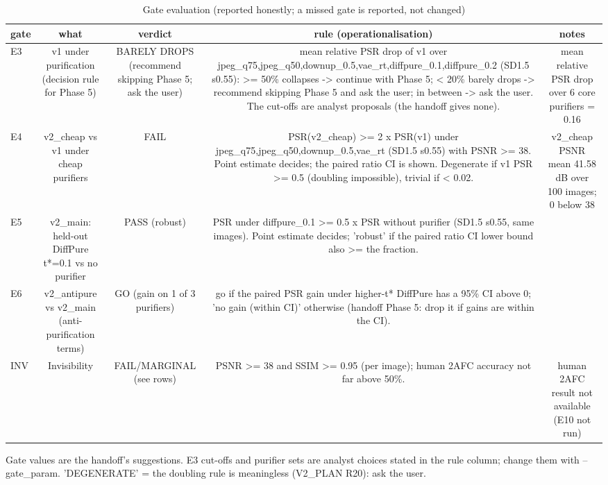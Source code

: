 \begin{table}[t]
\centering
\small
\begin{tabular}{lcccc}
\toprule
gate & what & verdict & rule (operationalisation) & notes \\
\midrule
E3 & v1 under purification (decision rule for Phase 5) & BARELY DROPS (recommend skipping Phase 5; ask the user) & mean relative PSR drop of v1 over jpeg\_q75,jpeg\_q50,downup\_0.5,vae\_rt,diffpure\_0.1,diffpure\_0.2 (SD1.5 s0.55): >= 50\% collapses -> continue with Phase 5; < 20\% barely drops -> recommend skipping Phase 5 and ask the user; in between -> ask the user. The cut-offs are analyst proposals (the handoff gives none). & mean relative PSR drop over 6 core purifiers = 0.16 \\
E4 & v2\_cheap vs v1 under cheap purifiers & FAIL & PSR(v2\_cheap) >= 2 x PSR(v1) under jpeg\_q75,jpeg\_q50,downup\_0.5,vae\_rt (SD1.5 s0.55) with PSNR >= 38. Point estimate decides; the paired ratio CI is shown. Degenerate if v1 PSR >= 0.5 (doubling impossible), trivial if < 0.02. & v2\_cheap PSNR mean 41.58 dB over 100 images; 0 below 38 \\
E5 & v2\_main: held-out DiffPure t*=0.1 vs no purifier & PASS (robust) & PSR under diffpure\_0.1 >= 0.5 x PSR without purifier (SD1.5 s0.55, same images). Point estimate decides; 'robust' if the paired ratio CI lower bound also >= the fraction. &  \\
E6 & v2\_antipure vs v2\_main (anti-purification terms) & GO (gain on 1 of 3 purifiers) & go if the paired PSR gain under higher-t* DiffPure has a 95\% CI above 0; 'no gain (within CI)' otherwise (handoff Phase 5: drop it if gains are within the CI). &  \\
INV & Invisibility & FAIL/MARGINAL (see rows) & PSNR >= 38 and SSIM >= 0.95 (per image); human 2AFC accuracy not far above 50\%. & human 2AFC result not available (E10 not run) \\
\bottomrule
\end{tabular}
\caption{Gate evaluation (reported honestly; a missed gate is reported, not changed)}
\label{tab:gates}
\par\footnotesize Gate values are the handoff's suggestions. E3 cut-offs and purifier sets are analyst choices stated in the rule column; change them with --gate\_param. 'DEGENERATE' = the doubling rule is meaningless (V2\_PLAN R20): ask the user.
\end{table}
